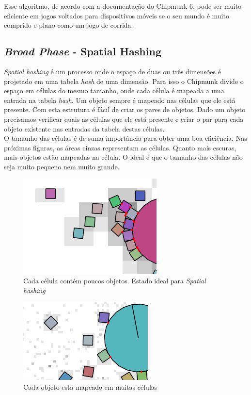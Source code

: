Esse algoritmo, de acordo com a documentação do Chipmunk 6, pode ser muito eficiente em jogos voltados para dispositivos móveis se o seu mundo é muito comprido 
e plano como um jogo de corrida.

\subsection{\textit{Broad Phase} - Spatial Hashing}

\textit{Spatial hashing} é um processo onde o espaço de duas ou três dimensões é projetado em uma tabela \textit{hash} de uma dimensão. Para isso o Chipmunk divide o espaço em 
células do mesmo tamanho, onde cada célula é mapeada a uma entrada na tabela \textit{hash}. Um objeto sempre é mapeado nas células que ele está presente. Com esta estrutura 
  é fácil de criar os pares de objetos. Dado um objeto precisamos verificar quais as células que ele está presente e criar o par para cada objeto existente nas 
entradas da tabela destas células.\\

O tamanho das células é de suma importância para obter uma boa eficiência. Nas próximas figuras, as áreas cinzas representam as células. Quanto mais escuras, mais objetos estão mapeadas na célula. O ideal é que o tamanho das células não seja muito pequeno nem muito grande.\\

\begin{figure}[!htbp]
  \centering
  \includegraphics[scale=1]{hash_just_right.png}
  \caption{Cada célula contém poucos objetos. Estado ideal para \textit{Spatial hashing}}
\end{figure}

\begin{figure}[!htbp]
  \centering
  \includegraphics[scale=1]{hash_too_small.png}
  \caption{Cada objeto está mapeado em muitas células}
\end{figure}

